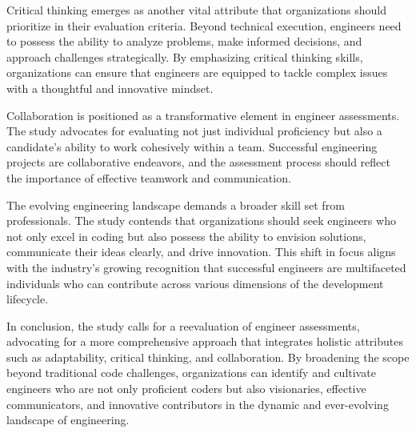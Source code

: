 \documentclass[
    a4paper, %
    10pt, %
    unnumberedsections, %
    twoside, %
]{LTJournalArticle}
\begin{document}
Critical thinking emerges as another vital attribute that organizations should prioritize in their evaluation criteria. Beyond technical execution, engineers need to possess the ability to analyze problems, make informed decisions, and approach challenges strategically. By emphasizing critical thinking skills, organizations can ensure that engineers are equipped to tackle complex issues with a thoughtful and innovative mindset.

Collaboration is positioned as a transformative element in engineer assessments. The study advocates for evaluating not just individual proficiency but also a candidate's ability to work cohesively within a team. Successful engineering projects are collaborative endeavors, and the assessment process should reflect the importance of effective teamwork and communication.

The evolving engineering landscape demands a broader skill set from professionals. The study contends that organizations should seek engineers who not only excel in coding but also possess the ability to envision solutions, communicate their ideas clearly, and drive innovation. This shift in focus aligns with the industry's growing recognition that successful engineers are multifaceted individuals who can contribute across various dimensions of the development lifecycle.

In conclusion, the study calls for a reevaluation of engineer assessments, advocating for a more comprehensive approach that integrates holistic attributes such as adaptability, critical thinking, and collaboration. By broadening the scope beyond traditional code challenges, organizations can identify and cultivate engineers who are not only proficient coders but also visionaries, effective communicators, and innovative contributors in the dynamic and ever-evolving landscape of engineering.
\end{document}
